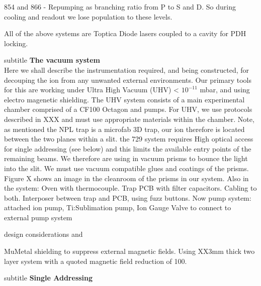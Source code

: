 \documentclass{article}
\begin{document}
854 and 866 - Repumping as branching ratio from P to S and D. So
during cooling and readout we lose population to these levels.

All of the above systems are Toptica Diode lasers coupled to a cavity
for PDH locking.


subtitle \textbf{The vacuum system}\\

Here we shall describe the instrumentation required, and being
constructed, for decouping the ion from any unwanted external
environments. Our primary tools for this are working under Ultra High
Vacuum (UHV) < $10^{-11}$ mbar, and using electro magenetic
shielding. The UHV system consists of a main experimental chamber
comprised of a CF100 Octagon and pumps. For UHV, we use protocols
described in XXX and must use appropriate materials within the
chamber. Note, as mentioned the NPL trap is a microfab 3D trap, our
ion therefore is located between the two planes within a slit. the 729
system requires High optical access for single addressing (see below)
and this limits the available entry points of the remaining beams. We
therefore are using in vacuum prisms to bounce the light into the
slit. We must use vacuum compatible glues and coatings of the
prisms. Figure X shows an image in the cleanroom of the prisms in our
system.
Also in the system:
Oven with thermocouple.
Trap PCB with filter capacitors.
Cabling to both.
Interposer between trap and PCB, using fuzz buttons.
Now pump system:
attached ion pump,
Ti:Sublimation pump,
Ion Gauge
Valve to connect to external pump system

design considerations and 

MuMetal shielding to suppress external magnetic fields. Using XX3mm
thick two layer system with a quoted magnetic field reduction of 100.


subtitle \textbf{Single Addressing}\\
\end{document}

